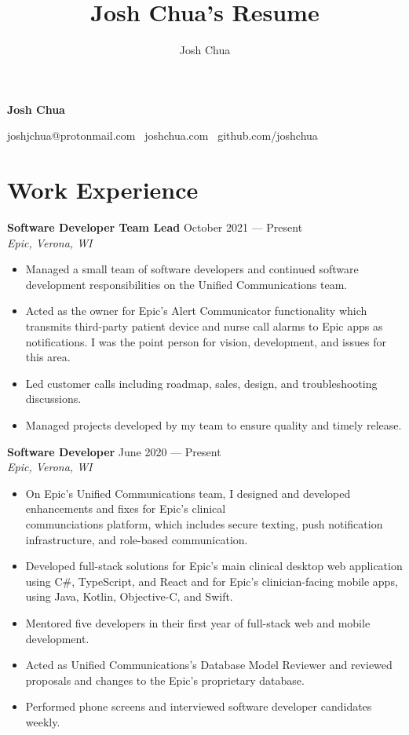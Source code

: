\documentclass{article}
\title{Josh Chua's Resume}
\author{Josh Chua}
\begin{document}
\centerline{\LARGE\textbf{Josh Chua}}
\smallskip
\centerline{
  joshjchua@protonmail.com \textbullet \
  joshchua.com \textbullet \
  github.com/joshchua}

\section*{Work Experience}
\textbf{Software Developer Team Lead} \hfill October 2021 --- Present\\
\textit{Epic, Verona, WI}
\begin{itemize}
\item Managed a small team of software developers and continued software development
  responsibilities on the Unified Communications team.
\item Acted as the owner for Epic's Alert Communicator functionality which
  transmits third-party patient device and nurse call alarms to Epic apps as
  notifications. I was the point person for vision, development, and issues
  for this area.
\item Led customer calls including roadmap, sales, design, and troubleshooting discussions.
\item Managed projects developed by my team to ensure quality and timely release.
\end{itemize}
\medskip

\textbf{Software Developer} \hfill June 2020 --- Present\\
\textit{Epic, Verona, WI}
\begin{itemize}
\item On Epic's Unified Communications team, I designed and developed
  enhancements and fixes for Epic's clinical\\ communciations platform, which
  includes secure texting, push notification infrastructure, and role-based
  communication.
\item Developed full-stack solutions for Epic's main clinical desktop web application
  using C\#, TypeScript, and React and for Epic's clinician-facing mobile apps, using Java,
  Kotlin, Objective-C, and Swift.
\item Mentored five developers in their first year of full-stack web and
  mobile development.
\item Acted as Unified Communications's Database Model Reviewer and reviewed
  proposals and changes to the Epic's proprietary database.
\item Performed phone screens and interviewed software developer candidates weekly.
\end{itemize}
\medskip
\end{document}
